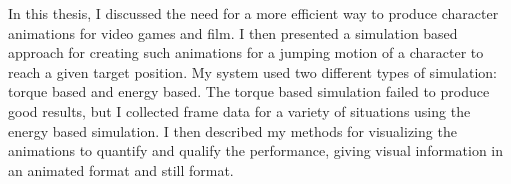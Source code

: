 In this thesis, I discussed the need for a more efficient way to produce character animations for video games and film.  I then presented a simulation based approach for creating such animations for a jumping motion of a character to reach a given target position.  My system used two different types of simulation: torque based and energy based.  The torque based simulation failed to produce good results, but I collected frame data for a variety of situations using the energy based simulation.  I then described my methods for visualizing the animations to quantify and qualify the performance, giving visual information in an animated format and still format.

